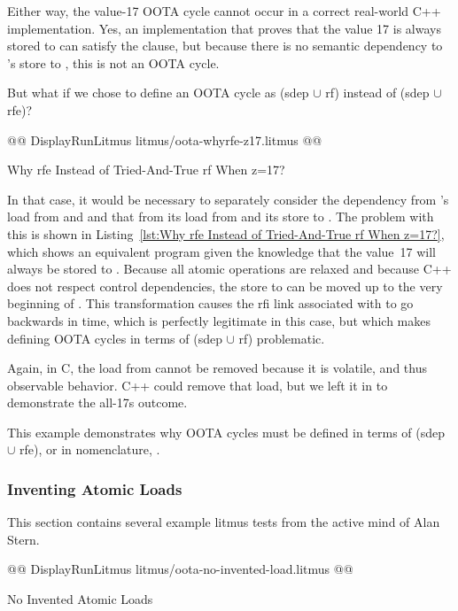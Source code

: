 \documentclass[10]{article}
\begin{document}
Either way, the value-17 OOTA cycle cannot occur in a correct real-world
C++ implementation.
Yes, an implementation that proves that the value 17 is always
stored to  can satisfy the  clause, but because
there is no semantic dependency to 's store to ,
this is not an OOTA cycle.

But what if we chose to define an OOTA cycle as (sdep $\cup$ rf) instead
of (sdep $\cup$ rfe)?

\begin{listing}[tbp]
@@ DisplayRunLitmus litmus/oota-whyrfe-z17.litmus @@
\caption{Why rfe Instead of Tried-And-True rf When z=17?}
\label{lst:Why rfe Instead of Tried-And-True rf When z=17?}
\end{listing}

In that case, it would be necessary to separately consider the dependency
from 's load from  and  and that from its load
from  and its store to .
The problem with this is shown in
Listing~\ref{lst:Why rfe Instead of Tried-And-True rf When z=17?},
which shows an equivalent program given the knowledge that the value~17
will always be stored to .
Because all atomic operations are relaxed and because C++ does not
respect control dependencies, the store to  can be moved up
to the very beginning of .
This transformation causes the rfi link associated with  to
go backwards in time, which is perfectly legitimate in this case,
but which makes defining OOTA cycles in terms of (sdep $\cup$ rf)
problematic.

Again, in C, the load from  cannot be removed because it is
volatile, and thus observable behavior.
C++ could remove that load, but we left it in to demonstrate the all-17s
outcome.

This example demonstrates why OOTA cycles must be defined in terms
of (sdep $\cup$ rfe), or in  nomenclature,
.

\subsubsection{Inventing Atomic Loads}
\label{app:Inventing Atomic Loads}

This section contains several example litmus tests from the active
mind of Alan Stern.

\begin{listing}[tbp]
@@ DisplayRunLitmus litmus/oota-no-invented-load.litmus @@
\caption{No Invented Atomic Loads}
\label{lst:No Invented Atomic Loads}
\end{listing}
\end{document}
